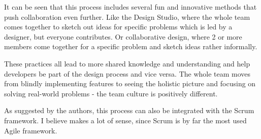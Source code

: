 It can be seen that this process includes several fun and innovative methods that push collaboration
even further. Like the Design Studio, where the whole team comes together to sketch out ideas for
specific problems which is led by a designer, but everyone contributes.
 Or collaborative design, where 2 or more
members come together for a specific problem and sketch ideas rather informally.

These practices all lead to more shared knowledge and understanding and help developers be part of
the design process and vice versa. The whole team moves from blindly implementing features to seeing
the holistic picture and focusing on solving real-world problems - the team culture is positively
different.

As suggested by the authors, this process can also be integrated with the Scrum framework. I believe
makes a lot of sense, since Scrum is by far the most used Agile framework.
